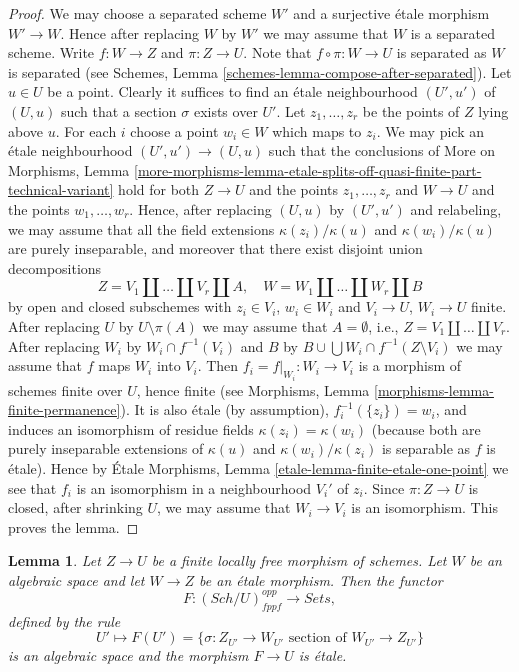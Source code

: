 \documentclass{stacks-project}
\theoremstyle{plain}
\newtheorem{lemma}[subsection]{Lemma}
\theoremstyle{definition}
\theoremstyle{remark}
\numberwithin{equation}{subsection}
\def\Sch{\mathit{Sch}}
\begin{document}
\begin{proof}
We may choose a separated scheme $W'$ and a surjective \'etale morphism
$W' \to W$. Hence after replacing $W$ by $W'$ we may assume that $W$
is a separated scheme. Write $f : W \to Z$ and $\pi : Z \to U$.
Note that $f \circ \pi : W \to U$ is separated as
$W$ is separated (see
Schemes, Lemma \ref{schemes-lemma-compose-after-separated}).
Let $u \in U$ be a point. Clearly it suffices
to find an \'etale neighbourhood $(U', u')$ of $(U, u)$ such that
a section $\sigma$ exists over $U'$. Let $z_1, \ldots, z_r$
be the points of $Z$ lying above $u$. For each $i$ choose a point
$w_i \in W$ which maps to $z_i$. We may pick an \'etale neighbourhood
$(U', u') \to (U, u)$ such that the conclusions of
More on Morphisms, Lemma
\ref{more-morphisms-lemma-etale-splits-off-quasi-finite-part-technical-variant}
hold for both $Z \to U$ and the points $z_1, \ldots, z_r$
and $W \to U$ and the points $w_1, \ldots, w_r$. Hence, after
replacing $(U, u)$ by $(U', u')$ and relabeling, we may assume that
all the field extensions $\kappa(z_i)/\kappa(u)$ and
$\kappa(w_i)/\kappa(u)$ are purely inseparable, and moreover
that there exist disjoint union decompositions
$$
Z = V_1 \amalg \ldots \amalg V_r \amalg A, \quad
W = W_1 \amalg \ldots \amalg W_r \amalg B
$$
by open and closed subschemes
with $z_i \in V_i$, $w_i \in W_i$ and $V_i \to U$, $W_i \to U$ finite.
After replacing $U$ by $U \setminus \pi(A)$ we may assume that
$A = \emptyset$, i.e., $Z = V_1 \amalg \ldots \amalg V_r$.
After replacing $W_i$ by $W_i \cap f^{-1}(V_i)$ and
$B$ by $B \cup \bigcup W_i \cap f^{-1}(Z \setminus V_i)$
we may assume that $f$ maps $W_i$ into $V_i$.
Then $f_i = f|_{W_i} : W_i \to V_i$ is a morphism of schemes finite over $U$,
hence finite (see
Morphisms, Lemma \ref{morphisms-lemma-finite-permanence}).
It is also \'etale (by assumption),
$f_i^{-1}(\{z_i\}) = w_i$, and induces an isomorphism of residue
fields $\kappa(z_i) = \kappa(w_i)$ (because both are purely inseparable
extensions of $\kappa(u)$ and $\kappa(w_i)/\kappa(z_i)$
is separable as $f$ is \'etale). Hence by
\'Etale Morphisms, Lemma \ref{etale-lemma-finite-etale-one-point}
we see that $f_i$ is an isomorphism in a neighbourhood $V_i'$ of
$z_i$. Since $\pi : Z \to U$ is closed, after shrinking $U$, we may assume
that $W_i \to V_i$ is an isomorphism. This proves the lemma.
\end{proof}

\begin{lemma}
\label{lemma-space-of-sections}
Let $Z \to U$ be a finite locally free morphism of schemes.
Let $W$ be an algebraic space and let $W \to Z$ be an \'etale morphism.
Then the functor
$$
F : (\Sch/U)_{fppf}^{opp} \longrightarrow \textit{Sets},
$$
defined by the rule
$$
U' \longmapsto
F(U') =
\{\sigma : Z_{U'} \to W_{U'}\text{ section of }W_{U'} \to Z_{U'}\}
$$
is an algebraic space and the morphism $F \to U$ is \'etale.
\end{lemma}
\end{document}
